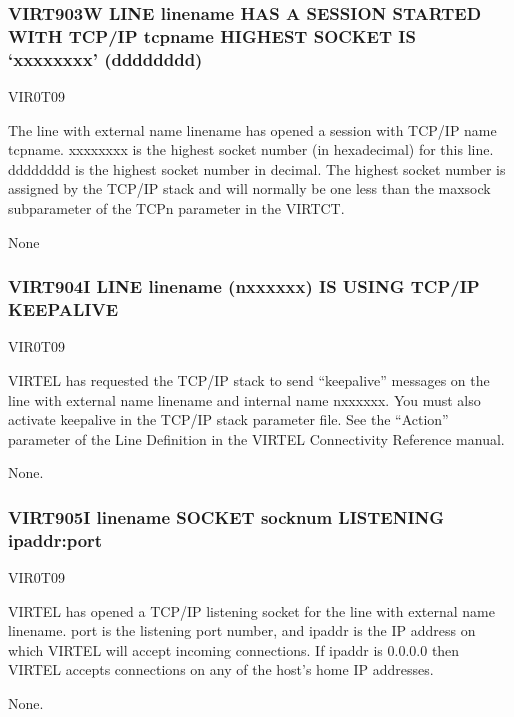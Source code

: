 \documentclass[letterpaper,10pt,english]{sphinxmanual}
\begin{document}
\subsubsection{VIRT903W LINE linename HAS A SESSION STARTED WITH TCP/IP tcpname HIGHEST SOCKET IS ‘xxxxxxxx’ (dddddddd)}
\label{\detokenize{messages:virt903w-line-linename-has-a-session-started-with-tcp-ip-tcpname-highest-socket-is-xxxxxxxx-dddddddd}}\begin{description}
\sphinxAtStartPar
VIR0T09

\sphinxAtStartPar
The line with external name linename has opened a session with TCP/IP name tcpname. xxxxxxxx is the highest socket number (in hexadecimal) for this line. dddddddd is the highest socket number in decimal. The highest socket number is assigned by the TCP/IP stack and will normally be one less than the maxsock subparameter of the TCPn parameter in the VIRTCT.

\sphinxAtStartPar
None

\end{description}


\subsubsection{VIRT904I LINE linename (n\sphinxhyphen{}xxxxxx) IS USING TCP/IP KEEPALIVE}
\label{\detokenize{messages:virt904i-line-linename-n-xxxxxx-is-using-tcp-ip-keepalive}}\begin{description}
\sphinxAtStartPar
VIR0T09

\sphinxAtStartPar
VIRTEL has requested the TCP/IP  stack to send “keepalive” messages on the line with external name linename and internal name n\sphinxhyphen{}xxxxxx. You must also activate keepalive in the TCP/IP stack parameter file. See the “Action” parameter of the Line Definition in the VIRTEL Connectivity Reference manual.

\sphinxAtStartPar
None.

\end{description}


\subsubsection{VIRT905I linename SOCKET socknum LISTENING ipaddr:port}
\label{\detokenize{messages:virt905i-linename-socket-socknum-listening-ipaddr-port}}\begin{description}
\sphinxAtStartPar
VIR0T09

\sphinxAtStartPar
VIRTEL has opened a TCP/IP listening socket for the line with external name linename. port is the listening port number, and ipaddr is the IP address on which VIRTEL will accept incoming connections. If ipaddr is 0.0.0.0 then VIRTEL accepts connections on any of the host’s home IP addresses.

\sphinxAtStartPar
None.

\end{description}
\end{document}
